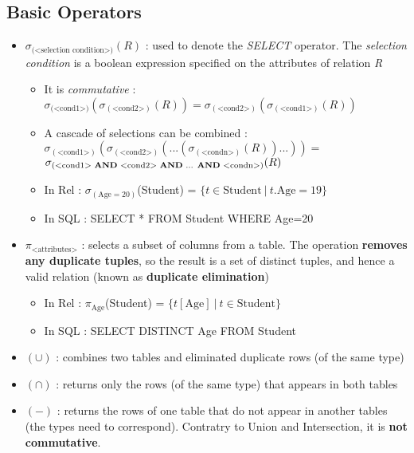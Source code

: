 \subsection{Basic Operators}

\begin{itemize}
    \item {} $\sigma_{\text{(<selection condition>)}}(R)$ : used to denote the \textit{SELECT} operator. The \textit{selection condition} is a boolean expression specified on the attributes of relation \textit{R}
        \begin{itemize}
            \item It is \textit{commutative} : $\sigma_{(\text{<cond1>)}}(\sigma_{(\text{<cond2>})}(R)) = \sigma_{(\text{<cond2>})}(\sigma_{(\text{<cond1>})}(R))$
            \item A cascade of selections can be combined : $\sigma_{(\text{<cond1>})}(\sigma_{(\text{<cond2>})}(...(\sigma_{(\text{<condn>})}(R))...)) =$ \\$\sigma_{\text{(<cond1> \textbf{AND} <cond2> \textbf{AND} ... \textbf{AND} <condn>})}(R)$
            \item In Rel : $\sigma_{(\text{Age}=20)}$(Student) = $\{t \in \text{Student} \ | \ t.\text{Age}=19 \}$
            \item In SQL : SELECT * FROM Student WHERE Age=20
        \end{itemize}
    \item {} $\pi_{\text{<attributes>}}$ : selects a subset of columns from a table. The operation \textbf{removes any duplicate tuples}, so the result is a set of distinct tuples, and hence a valid relation (known as \textbf{duplicate elimination})
        \begin{itemize}
            \item In Rel : $\pi_{\text{Age}}$(Student) = $\{ t[\text{Age}] \ | \ t \in \text{Student} \}$
            \item In SQL : SELECT DISTINCT Age FROM Student
        \end{itemize}
    \item {} $(\cup)$ : combines two tables and eliminated duplicate rows (of the same type)
    \item {} $(\cap)$ : returns only the rows (of the same type) that appears in both tables
    \item {} $(-)$ : returns the rows of one table that do not appear in another tables (the types need to correspond). Contratry to Union and Intersection, it is \textbf{not commutative}.

\end{itemize}
